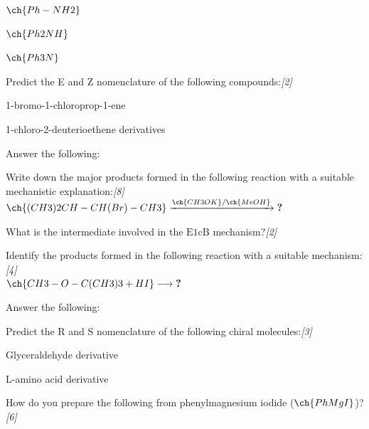 \documentclass[11pt,a4paper]{article}
\newcommand{\pts}[1]{\hfill   \textit{[#1]}}
\begin{document}
\begin{enumerate}[label=   \textbf{\arabic*.}]
\begin{parts}
\begin{parts}
            \item $\ch{Ph-NH2}$
            \item $\ch{Ph2NH}$
            \item $\ch{Ph3N}$
        \end{parts}
        \item Predict the E and Z nomenclature of the following compounds:\pts{2}
        
\begin{parts}
            \item 1-bromo-1-chloroprop-1-ene
            \item 1-chloro-2-deuterioethene derivatives
        \end{parts}
    \end{parts}

    \bigskip

    \item Answer the following:
    
\begin{parts}
        \item Write down the major products formed in the following reaction with a suitable mechanistic explanation:\pts{8}\\[4pt]
        $\ch{(CH3)2CH-CH(Br)-CH3} \xrightarrow{\ch{CH3OK} / \ch{MeOH}}   \textbf{?}$
        \item What is the intermediate involved in the $ \text{E}1 \text{cB}$ mechanism?\pts{2}
        \item Identify the products formed in the following reaction with a suitable mechanism:\pts{4}\\[4pt]
        $\ch{CH3-O-C(CH3)3 + HI} \longrightarrow   \textbf{?}$
    \end{parts}

    \bigskip

    \item Answer the following:
    
\begin{parts}
        \item Predict the R and S nomenclature of the following chiral molecules:\pts{3}
        
\begin{parts}
            \item Glyceraldehyde derivative
            \item L-amino acid derivative
        \end{parts}
        \item How do you prepare the following from phenylmagnesium iodide ($\ch{PhMgI}$)?\pts{6}
        

\end{parts}
\end{enumerate}
\end{document}
